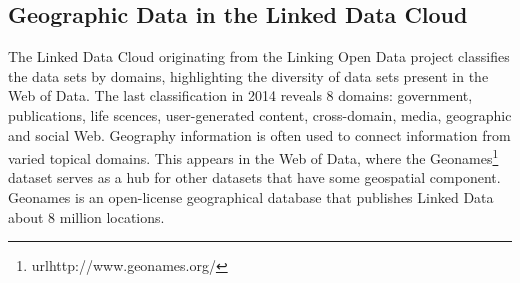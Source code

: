 \subsection{Geographic Data in the Linked Data Cloud}
\label{sec:geoldcloud}

The Linked Data Cloud originating from the Linking Open Data project classifies the data sets by domains, highlighting the diversity of data sets present in the Web of Data. The last classification in 2014 reveals 8 domains: government, publications, life scences, user-generated content, cross-domain, media, geographic and social Web. 
Geography information is often used to connect information from varied topical domains. This appears in the Web of Data, where the Geonames\footnote{url{http://www.geonames.org/}} dataset serves as a hub for other datasets that have some geospatial component. Geonames is an open-license geographical database that publishes Linked Data about 8 million locations.

\begin{figure}[ht!]
\end{figure}

